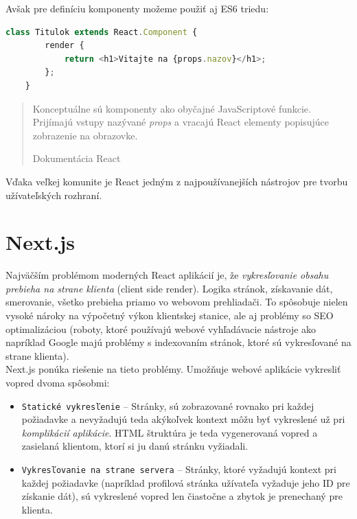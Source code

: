 \medskip

\noindent Avšak pre definíciu komponenty možeme použiť aj ES6 triedu: \\

\begin{lstlisting}[language=TypeScript, caption=Príklad definície triednej komponenty.]
	class Titulok extends React.Component {
		render {
			return <h1>Vitajte na {props.nazov}</h1>;
		};
	}
\end{lstlisting}

\medskip

\blockquote[Dokumentácia React \cite{React}]{Konceptuálne sú komponenty ako obyčajné JavaScriptové funkcie. Prijímajú vstupy nazývané \emph{props} a vracajú React elementy popisujúce zobrazenie na obrazovke.}

\noindent Vďaka veľkej komunite je React jedným z najpoužívanejších nástrojov pre tvorbu užívateľských rozhraní. 

\section{Next.js}
\label{theory:nextjs}
Najväčším problémom moderných React aplikácií je, že \emph{vykresľovanie obsahu prebieha na strane klienta} (client side render). Logika stránok, získavanie dát, smerovanie, všetko prebieha priamo vo webovom prehliadači. To spôsobuje nielen vysoké nároky na výpočetný výkon klientskej stanice, ale aj problémy so SEO optimalizáciou (roboty, ktoré používajú webové vyhľadávacie nástroje ako napríklad Google majú problémy s indexovaním stránok, ktoré sú vykresľované na strane klienta). \\

\noindent Next.js ponúka riešenie na tieto problémy. Umožňuje webové aplikácie vykresliť vopred dvoma spôsobmi:

\begin{itemize}
	\item \texttt{Statické vykresľenie} -- Stránky, sú zobrazované rovnako pri každej požiadavke a nevyžadujú teda akýkoľvek kontext môžu byť vykreslené už pri \emph{komplikácií aplikácie}. HTML štruktúra je teda vygenerovaná vopred a zasielaná klientom, ktorí si ju danú stránku vyžiadali.
	\item \texttt{Vykresľovanie na strane servera} -- Stránky, ktoré vyžadujú kontext pri každej požiadavke (napríklad profilová stránka užívateľa vyžaduje jeho ID pre získanie dát), sú vykreslené vopred len čiastočne a zbytok je prenechaný pre klienta.
\end{itemize}

